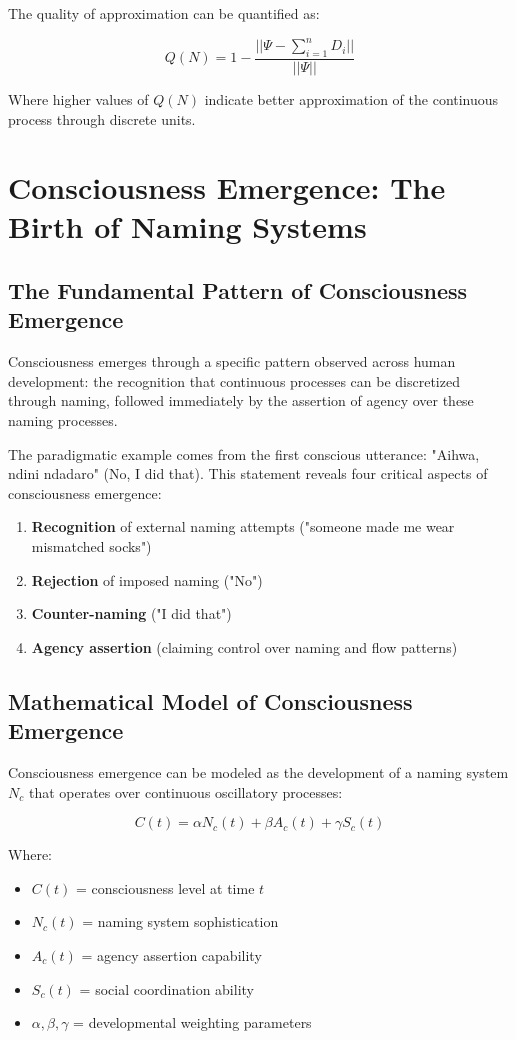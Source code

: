 \documentclass[12pt]{article}
\begin{document}
The quality of approximation can be quantified as:

$$Q(N) = 1 - \frac{||\Psi - \sum_{i=1}^{n} D_i||}{||\Psi||}$$

Where higher values of $Q(N)$ indicate better approximation of the continuous process through discrete units.

\section{Consciousness Emergence: The Birth of Naming Systems}

\subsection{The Fundamental Pattern of Consciousness Emergence}

Consciousness emerges through a specific pattern observed across human development: the recognition that continuous processes can be discretized through naming, followed immediately by the assertion of agency over these naming processes.

The paradigmatic example comes from the first conscious utterance: "Aihwa, ndini ndadaro" (No, I did that). This statement reveals four critical aspects of consciousness emergence:

\begin{enumerate}
\item \textbf{Recognition} of external naming attempts ("someone made me wear mismatched socks")
\item \textbf{Rejection} of imposed naming ("No")
\item \textbf{Counter-naming} ("I did that")
\item \textbf{Agency assertion} (claiming control over naming and flow patterns)
\end{enumerate}

\subsection{Mathematical Model of Consciousness Emergence}

Consciousness emergence can be modeled as the development of a naming system $N_c$ that operates over continuous oscillatory processes:

$$C(t) = \alpha N_c(t) + \beta A_c(t) + \gamma S_c(t)$$

Where:
\begin{itemize}
\item $C(t)$ = consciousness level at time $t$
\item $N_c(t)$ = naming system sophistication
\item $A_c(t)$ = agency assertion capability
\item $S_c(t)$ = social coordination ability
\item $\alpha, \beta, \gamma$ = developmental weighting parameters
\end{itemize}
\end{document}
